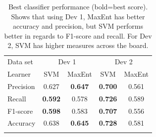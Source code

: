 \begin{table}[t!]
	\centering
	\begin{tabular}{l|cc|cc} 
	\noalign{\smallskip}\hline\noalign{\smallskip}
	Data set & \multicolumn{2}{c|}{Dev 1} & \multicolumn{2}{c}{Dev 2} \\
	Learner  & SVM    & MaxEnt & SVM    & MaxEnt \\
	\noalign{\smallskip}\hline\noalign{\smallskip}
	Precision  & 0.627  & {\bf 0.647}   & {\bf 0.700}  & 0.561 \\
	Recall       & {\bf 0.592}  & 0.578  & {\bf 0.726}  & 0.589 \\
	F1-score  & {\bf 0.598}  & 0.583  & {\bf 0.707}  & 0.556 \\
	Accuracy & 0.638  & {\bf 0.645}  & {\bf 0.728}  & 0.581 \\
	\noalign{\smallskip}\hline\noalign{\smallskip}
	\end{tabular}
	\caption[Best classifier performance]{Best classifier performance {\small (bold=best score)}. Shows that using Dev 1, MaxEnt has better accuracy and precision, but SVM performs better in regards to F1-score and recall. For Dev 2, SVM has higher measures across the board.}
	\label{tab:performance}
\end{table}

